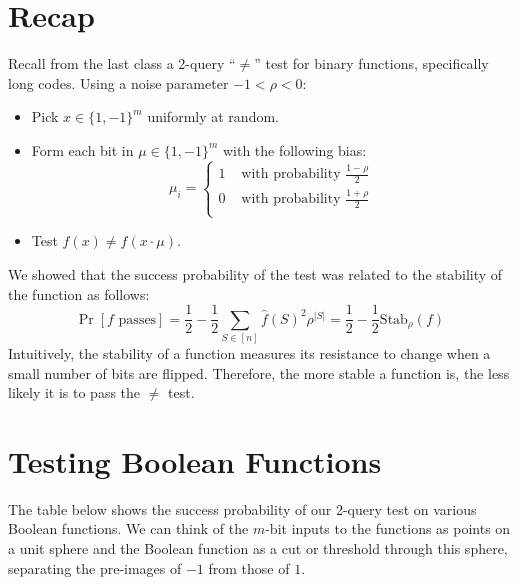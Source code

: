 \documentclass[12pt]{article}
\begin{document}
\MakeScribeTop

\def\Var{{\rm Var}\,}
\def\qopnamewl@#1{\mathop{\fam\z@#1}\nlimits@}
\def\Exp{\mathop{\rm {E}}}
\def\Stab{\mathop{\rm {Stab}}}
\def\Inf{\mathop{\rm {Inf}}}
\def\maj{\mathop{\rm {maj}}}
\def\sgn{\mathop{\rm {sgn}}}
\def\dist{{\rm dist}\,}
\section{Recap}

Recall from the last class a 2-query ``$\ne$'' test for binary functions,
specifically long codes.
Using a noise parameter $-1 < \rho < 0$:

\begin{itemize}
\item Pick $x \in \{1,-1\}^m$ uniformly at random.
\item Form each bit in $\mu \in \{1,-1\}^m$ with the following bias:
\begin{equation}
\mu_i = \left\{ \begin{array}{ll}
1 & \textrm{ with probability } \frac{1 - \rho}{2}\\
0 & \textrm{ with probability } \frac{1 + \rho}{2}\\
\end{array} \right.
\end{equation}
\item Test $f(x) \ne f(x\cdot\mu)$.
\end{itemize}
We showed that the success probability of the test was related to the
stability of the function as follows:
\begin{equation}
\Pr\left[f \textrm{ passes}\right] = \frac{1}{2} - \frac{1}{2}
\sum_{S \in \left[n\right]}\hat{f}(S)^2\rho^{|S|} =
\frac{1}{2} - \frac{1}{2}\textrm{Stab}_{\rho}(f)
\end{equation}
Intuitively, the stability of a function measures its resistance to change
when a small number of bits are flipped. Therefore, the
more stable a function is, the less likely it is to pass the $\ne$ test.

\section{Testing Boolean Functions}

The table below shows the success probability of our 2-query test on
various Boolean functions. We can think of the $m$-bit inputs to the functions
as points on a unit sphere and the Boolean function as a cut or threshold
through this sphere, separating the pre-images of $-1$ from those of $1$.
\end{document}
